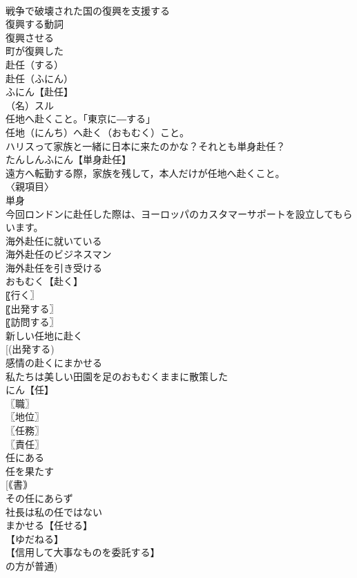 \documentclass[8pt]{extreport}
\begin{document}
\begin{CJK}{UTF8}{min}
\\	戦争で破壊された国の復興を支援する
\\	復興する動詞
\\	復興させる
\\	町が復興した
\\	赴任（する）　
\\	赴任（ふにん）
\\	ふにん【赴任】
\\	（名）スル
\\	任地へ赴くこと。「東京に―する」
\\	任地（にんち）へ赴く（おもむく）こと。
\\	ハリスって家族と一緒に日本に来たのかな？それとも単身赴任？
\\	たんしんふにん【単身赴任】
\\	遠方へ転勤する際，家族を残して，本人だけが任地へ赴くこと。
\\	〈親項目〉
\\	単身
\\	今回ロンドンに赴任した際は、ヨーロッパのカスタマーサポートを設立してもらいます。
\\	海外赴任に就いている
\\	海外赴任のビジネスマン
\\	海外赴任を引き受ける
\\	おもむく【赴く】
\\	〖行く〗
\\	〖出発する〗
\\	〖訪問する〗
\\	新しい任地に赴く
\\	[(出発する) 
\\	感情の赴くにまかせる
\\	私たちは美しい田園を足のおもむくままに散策した
\\	にん【任】
\\	〖職〗
\\	〖地位〗
\\	〖任務〗
\\	〖責任〗
\\	任にある
\\	任を果たす
\\	[｟書｠ 
\\	その任にあらず
\\	社長は私の任ではない
\\	まかせる【任せる】
\\	【ゆだねる】
\\	【信用して大事なものを委託する】
\\	の方が普通)

\end{CJK}
\end{document}
